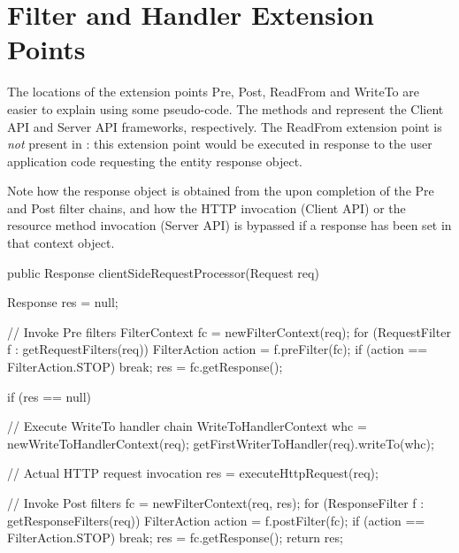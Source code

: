 \chapter{Filter and Handler Extension Points}
\label{extension_points}

The locations of the extension points Pre, Post, ReadFrom and WriteTo are easier to explain using some pseudo-code. The methods  and  represent the Client API and Server API frameworks, respectively. The ReadFrom extension point is \emph{not} present in : this extension point would be executed in response to the user application code requesting the entity response object. 

Note how the response object is obtained from the  upon completion of the Pre and Post filter chains, and how the HTTP invocation (Client API) or the resource method invocation (Server API) is bypassed if a response has been set in that context object. 

\begin{listing}{1}
public Response clientSideRequestProcessor(Request req) {
    Response res = null;

    // Invoke Pre filters
    FilterContext fc = newFilterContext(req);
    for (RequestFilter f : getRequestFilters(req)) {
        FilterAction action = f.preFilter(fc);
        if (action == FilterAction.STOP) break;
    }
    res = fc.getResponse();

    if (res == null) {
        // Execute WriteTo handler chain
        WriteToHandlerContext whc = newWriteToHandlerContext(req);
        getFirstWriterToHandler(req).writeTo(whc);

        // Actual HTTP request invocation
        res = executeHttpRequest(req);
    }

    // Invoke Post filters
    fc = newFilterContext(req, res);
    for (ResponseFilter f : getResponseFilters(req)) {
        FilterAction action = f.postFilter(fc);
        if (action == FilterAction.STOP) break;
    }
    res = fc.getResponse();       
    return res;
}
\end{listing}

